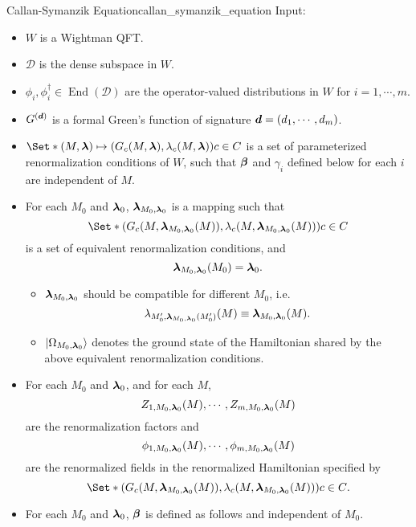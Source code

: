 \documentclass{article}
\begin{document}
\begin{theorem}{Callan-Symanzik Equation}{callan_symanzik_equation}
    Input:
    \begin{itemize}
        \item $W$ is a Wightman QFT.
        \item $\mathcal{D}$ is the dense subspace in $W$.
        \item $\phi_i,\phi^\dagger_i\in \operatorname{End}(\mathcal{D})$ are the operator-valued distributions in $W$ for $i=1,\cdots,m$.
        \item $G^{(\vb*{d})}$ is a formal Green's function of signature $\vb*{d} = (d_1,\cdots,d_m)$.
        \item $\Set*{(M,\vb*{\lambda}) \mapsto (G_c(M, \vb*{\lambda}),\lambda_c(M, \vb*{\lambda}))}{c\in C}$ is a set of parameterized renormalization conditions of $W$, such that $\vb*{\beta}$ and $\gamma_i$ defined below for each $i$ are independent of $M$.
        \item For each $M_0$ and $\vb*{\lambda}_0$, $\vb*{\lambda}_{M_0,\vb*{\lambda}_0}$ is a mapping such that
        \[ \Set*{(G_c(M, \vb*{\lambda}_{M_0,\vb*{\lambda}_0}(M)),\lambda_c(M, \vb*{\lambda}_{M_0,\vb*{\lambda}_0}(M)))}{c\in C} \]
        is a set of equivalent renormalization conditions, and
        \[ \vb*{\lambda}_{M_0,\vb*{\lambda}_0}(M_0) = \vb*{\lambda}_0. \]
        \begin{itemize}
            \item $\vb*{\lambda}_{M_0,\vb*{\lambda}_0}$ should be compatible for different $M_0$, i.e.
            \[ \lambda_{M'_0,\vb*{\lambda}_{M_0,\vb*{\lambda}_0}(M'_0)}(M) \equiv \vb*{\lambda}_{M_0,\vb*{\lambda}_0}(M). \]
            \item $\ket{\Omega_{M_0,\vb*{\lambda}_0}}$ denotes the ground state of the Hamiltonian shared by the above equivalent renormalization conditions.
        \end{itemize}
        \item For each $M_0$ and $\vb*{\lambda}_0$, and for each $M$, 
        \[ Z_{1,M_0,\vb*{\lambda}_0}(M), \cdots, Z_{m,M_0,\vb*{\lambda}_0}(M) \]
        are the renormalization factors and
        \[ \phi_{1,M_0,\vb*{\lambda}_0}(M), \cdots, \phi_{m,M_0,\vb*{\lambda}_0}(M) \]
        are the renormalized fields in the renormalized Hamiltonian specified by
        \[ \Set*{(G_c(M, \vb*{\lambda}_{M_0,\vb*{\lambda}_0}(M)),\lambda_c(M, \vb*{\lambda}_{M_0,\vb*{\lambda}_0}(M)))}{c\in C}. \]
        \item For each $M_0$ and $\vb*{\lambda}_0$, $\vb*{\beta}$ is defined as follows and independent of $M_0$.

\end{itemize}
\end{theorem}
\end{document}
